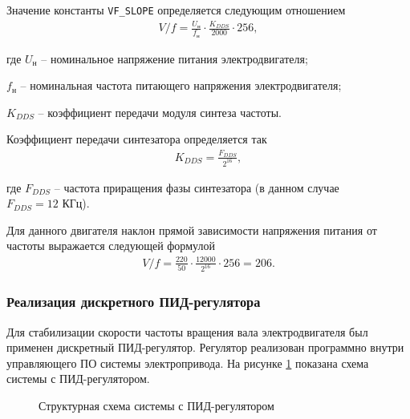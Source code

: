         Значение константы \verb"VF_SLOPE" определяется следующим отношением
        \begin{gather*}
            V/f = \frac{U_\text{н}}{f_\text{н}} \cdot \frac{K_{DDS}}{2000} \cdot 256,
        \end{gather*}

        где $U_\text{н}$ -- номинальное напряжение питания электродвигателя;\par
        $f_\text{н}$ -- номинальная частота питающего напряжения электродвигателя;\par
        $K_{DDS}$ -- коэффициент передачи модуля синтеза частоты.

        Коэффициент передачи синтезатора определяется так
        \begin{gather*}
            K_{DDS} = \frac{F_{DDS}}{2^{16}},
        \end{gather*}

        где $F_{DDS}$ -- частота приращения фазы синтезатора (в данном случае\\
        $F_{DDS} = 12$ КГц).

        Для данного двигателя наклон прямой зависимости напряжения питания от
        частоты выражается следующей формулой
        \begin{gather*}
            V/f = \frac{220}{50} \cdot \frac{12000}{2^{16}} \cdot 256 = 206.
        \end{gather*}
        \clearpage

    \subsubsection{Реализация дискретного ПИД-регулятора}
        Для стабилизации скорости частоты вращения вала электродвигателя был
        применен дискретный ПИД-регулятор. Регулятор реализован программно
        внутри управляющего ПО системы электропривода.
        На рисунке \ref{fig:system-with-pid} показана схема системы с
        ПИД-регулятором.
        \begin{figure}[h!]
            \caption{Структурная схема системы с ПИД-регулятором}
            \label{fig:system-with-pid}
        \end{figure}

